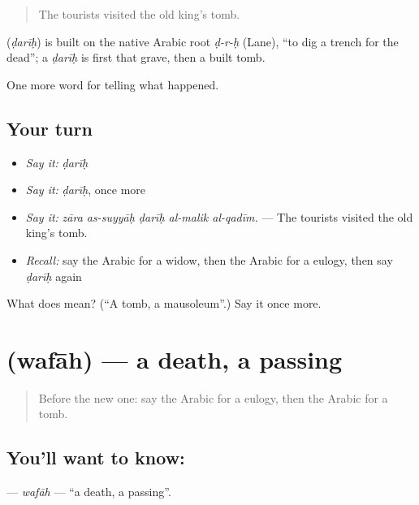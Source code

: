 \begin{quote}
The tourists visited the old king’s tomb.
\end{quote}

\begin{cousinweb}
\textbf{} (\emph{ḍarīḥ}) is built on the native Arabic root \emph{ḍ-r-ḥ} (Lane), \textquotedblleft{}to dig a trench for the dead\textquotedblright{}; a \emph{ḍarīḥ} is first that grave, then a built tomb.
\end{cousinweb}

\begin{grammarlens}[title={What you've built}]
One more word for telling what happened.
\end{grammarlens}

\subsection*{Your turn}
\begin{itemize}
\raggedright
  \item \emph{Say it:} \emph{ḍarīḥ}
  \item \emph{Say it:} \emph{ḍarīḥ}, once more
  \item \emph{Say it:} \emph{zāra as-suyyāḥ ḍarīḥ al-malik al-qadīm.} — The tourists visited the old king’s tomb.
  \item \emph{Recall:} say the Arabic for a widow, then the Arabic for a eulogy, then say \emph{ḍarīḥ} again
\end{itemize}

\begin{tcolorbox}[breakable,colback=teal!4,colframe=teal!35!black,title={Before you move on}]
What does  mean? (\textquotedblleft{}A tomb, a mausoleum\textquotedblright{}.) Say it once more.
\end{tcolorbox}
\section[\texorpdfstring{\ar{وفاة} (wafāh)}{وفاة (wafāh)}]{ (wafāh) — a death, a passing}

\label{lesson:AR-C338-wafah}



\begin{quote}
Before the new one: say the Arabic for a eulogy, then the Arabic for a tomb.
\end{quote}

\subsection*{You'll want to know: }
\textbf{} — \emph{wafāh} — \textquotedblleft{}a death, a passing\textquotedblright{}.

